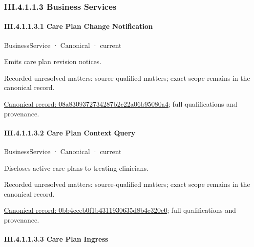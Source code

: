 \subsubsection*{III.4.1.1.3 Business Services}
\label{navigation:III.4.1.1.3}

\paragraph*{III.4.1.1.3.1 Care Plan Change Notification}
\label{navigation:III.4.1.1.3.1}

\label{element:08a8309372734287b2c22a06b95080a4}
{\small BusinessService · Canonical · current}\par

Emits care plan revision notices.


{\small Recorded unresolved matters: source-qualified matters; exact scope remains in the canonical record.}\par
{\footnotesize \href{../../../../continuum/business/business-service/08a8309372734287b2c22a06b95080a4.md}{Canonical record: 08a8309372734287b2c22a06b95080a4}; full qualifications and provenance.}\par
\paragraph*{III.4.1.1.3.2 Care Plan Context Query}
\label{navigation:III.4.1.1.3.2}

\label{element:0bb4cceb0f1b4311930635d8b4c320e0}
{\small BusinessService · Canonical · current}\par

Discloses active care plans to treating clinicians.


{\small Recorded unresolved matters: source-qualified matters; exact scope remains in the canonical record.}\par
{\footnotesize \href{../../../../continuum/business/business-service/0bb4cceb0f1b4311930635d8b4c320e0.md}{Canonical record: 0bb4cceb0f1b4311930635d8b4c320e0}; full qualifications and provenance.}\par
\paragraph*{III.4.1.1.3.3 Care Plan Ingress}
\label{navigation:III.4.1.1.3.3}

